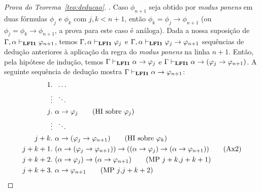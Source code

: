 \begin{proof}[Prova do Teorema~\ref{teo:deducao}]
        . Caso $\phi_{n + 1}$ seja obtido por \textit{modus ponens} em duas fórmulas $\phi_{j}$ e $\phi_{k}$ com $j, k < n + 1$, então $\phi_{k} = \phi_{j} \to \phi_{n + 1}$ (ou $\phi_{j} = \phi_{k} \to \phi_{n + 1}$, a prova para este caso é análoga). Dada a nossa suposição de $\Gamma, \alpha \vdash_{\textbf{LFI1}{}} \varphi_{n + 1}$, temos $\Gamma, \alpha \vdash_{\textbf{LFI1}{}} \varphi_{j}$ e $\Gamma, \alpha \vdash_{\textbf{LFI1}{}} \varphi_{j} \to \varphi_{n + 1}$ sequências de dedução anteriores à aplicação da regra do \textit{modus ponens} na linha $n + 1$. Então, pela hipótese de indução, temos $\Gamma \vdash_{\textbf{LFI1}{}} \alpha \to \varphi_{j}$ e $\Gamma \vdash_{\textbf{LFI1}{}} \alpha \to (\varphi_{j} \to \varphi_{n + 1})$. A seguinte sequência de dedução mostra $\Gamma \vdash_{\textbf{LFI1}{}} \alpha \to \varphi_{n + 1}$:
        \begin{align*}
            \text{1}&.~ \; \ldots\\
            &\vdots \; ~\ddots\\
            \text{$j$}&.~ \alpha \to \phi_{j} \tag{HI sobre $\phi_{j}$}\\
            &\vdots \; ~\ddots\\
            \text{$j + k$}&.~ \alpha \to (\phi_{j} \to \phi_{n + 1}) \tag{HI sobre $\phi_{k}$}\\
            \text{$j + k + 1$}&.~ (\alpha \to (\phi_{j} \to \phi_{n + 1})) \to ((\alpha \to \phi_{j}) \to (\alpha \to \phi_{n + 1})) \tag{Ax2}\\
            \text{$j + k + 2$}&.~ (\alpha \to \phi_{j}) \to (\alpha \to \phi_{n + 1}) \tag{MP $j + k$,$j + k + 1$}\\
             \text{$j + k + 3$}&.~ \alpha \to \phi_{n + 1} \tag{MP $j$,$j + k + 2$}
        \end{align*}
    \end{proof}
